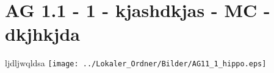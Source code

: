 \section{AG 1.1 - 1 - kjashdkjas - MC - dkjhkjda}

\begin{beispiel}[AG 1.1]{1}
ljdljwqldsa \texttt{[image: ../Lokaler\_Ordner/Bilder/AG11\_1\_hippo.eps]}
\end{beispiel}